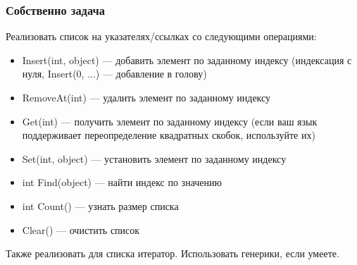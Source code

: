 \documentclass{../slides-style}
\begin{document}
    \begin{frame}
        \frametitle{Собственно задача}
        Реализовать список на указателях/ссылках со следующими операциями:
        \begin{itemize}
            \item Insert(int, object) --- добавить элемент по заданному индексу (индексация с нуля, Insert(0, ...) --- добавление в голову)
            \item RemoveAt(int) --- удалить элемент по заданному индексу
            \item Get(int) --- получить элемент по заданному индексу (если ваш язык поддерживает переопределение квадратных скобок, используйте их)
            \item Set(int, object) --- установить элемент по заданному индексу
            \item int Find(object) --- найти индекс по значению
            \item int Count() --- узнать размер списка
            \item Clear() --- очистить список
        \end{itemize}
        Также реализовать для списка итератор. Использовать генерики, если умеете.
    \end{frame}
\end{document}
